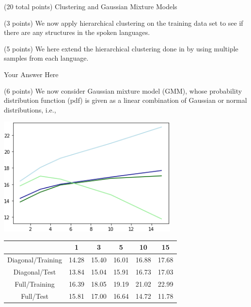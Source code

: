\documentclass[12pt]{article}
\begin{document}
\begin{question}{(20 total points) Clustering and Gaussian Mixture Models}
\begin{subquestion}{(3 points)
       We now apply hierarchical clustering on the training data set
       to see if there are any structures in the spoken languages.
     }
   \end{subquestion}
   \begin{subquestion}{(5 points)
       We here extend the hierarchical clustering done in  by
       using multiple samples from each language.
     } \label{Q3.4}


   

      \begin{answerbox}{50em}
         Your Answer Here
      \end{answerbox}
  


   \end{subquestion}
   \begin{subquestion}{(6 points)
       We now consider Gaussian mixture model (GMM), whose
       probability distribution function (pdf) is given as
       a linear combination of Gaussian or normal distributions, i.e.,
     } \label{Q3.5}




      \begin{answerbox}{30em}
            \begin{center}
			\includegraphics[width=0.68\textwidth]{imgs/3_5.png}
			\begin{tabular}{|c|c|c|c|c|c|}

			\hline 
 & 1 & 3 & 5 & 10 & 15\\ \hline
Diagonal/Training & 14.28 & 15.40 & 16.01 & 16.88 & 17.68 \\ \hline
Diagonal/Test & 13.84 & 15.04 & 15.91 & 16.73 & 17.03 \\ \hline
Full/Training & 16.39 & 18.05 & 19.19 & 21.02 & 22.99 \\ \hline
Full/Test & 15.81 & 17.00 & 16.64 & 14.72 & 11.78 \\ \hline


\end{tabular}
\end{center}
\end{answerbox}
\end{subquestion}
\end{question}
\end{document}
